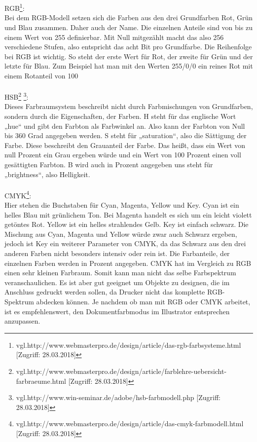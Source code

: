 \leavevmode \\
\leavevmode \\
RGB\footnote{\label{} vgl.http://www.webmasterpro.de/design/article/das-rgb-farbsysteme.html [Zugriff: 28.03.2018]}:
\leavevmode \\
Bei dem RGB-Modell setzen sich die Farben aus den drei Grundfarben Rot, Grün und Blau zusammen. Daher auch der Name. Die einzelnen Anteile sind von bis zu einem Wert von 255 definierbar. Mit Null mitgezählt macht das also 256 verschiedene Stufen, also entspricht das acht Bit pro Grundfarbe. Die Reihenfolge bei RGB ist wichtig. So steht der erste Wert für Rot, der zweite für Grün und der letzte für Blau. Zum Beispiel hat man mit den Werten 255/0/0 ein reines Rot mit einem Rotanteil von 100%
\leavevmode \\
\leavevmode \\
HSB\footnote{\label{} vgl.http://www.webmasterpro.de/design/article/farblehre-uebersicht-farbraeume.html [Zugriff: 28.03.2018]}
\footnote{\label{} vgl.http://www.win-seminar.de/adobe/hsb-farbmodell.php [Zugriff: 28.03.2018]}:
\leavevmode \\
Dieses Farbraumsystem beschreibt nicht durch Farbmischungen von Grundfarben, sondern durch die Eigenschaften, der Farben. H steht für das englische Wort „hue“ und gibt den Farbton als Farbwinkel an. Also kann der Farbton von Null bis 360 Grad angegeben werden. S steht für „saturation“, also die Sättigung der Farbe. Diese beschreibt den Grauanteil der Farbe. Das heißt, dass ein Wert von null Prozent ein Grau ergeben würde und ein Wert von 100 Prozent einen voll gesättigten Farbton. B wird auch in Prozent angegeben uns steht für „brightness“, also Helligkeit.
\leavevmode \\
\leavevmode \\
CMYK\footnote{\label{} vgl.http://www.webmasterpro.de/design/article/das-cmyk-farbmodell.html [Zugriff: 28.03.2018]}:
\leavevmode \\
Hier stehen die Buchstaben für Cyan, Magenta, Yellow und Key. Cyan ist ein helles Blau mit grünlichem Ton. Bei Magenta handelt es sich um ein leicht violett getöntes Rot. Yellow ist ein helles strahlendes Gelb. Key ist einfach schwarz. Die Mischung aus Cyan, Magenta und Yellow würde zwar auch Schwarz ergeben, jedoch ist Key ein weiterer Parameter von CMYK, da das Schwarz aus den drei anderen Farben nicht besonders intensiv oder rein ist. Die Farbanteile, der einzelnen Farben werden in Prozent angegeben. CMYK hat im Vergleich zu RGB einen sehr kleinen Farbraum. Somit kann man nicht das selbe Farbspektrum veranschaulichen. Es ist aber gut geeignet um Objekte zu designen, die im Anschluss gedruckt werden sollen, da Drucker nicht das komplette RGB-Spektrum abdecken können. Je nachdem ob man mit RGB oder CMYK arbeitet, ist es empfehlenswert, den Dokumentfarbmodus im Illustrator entsprechen anzupassen.
